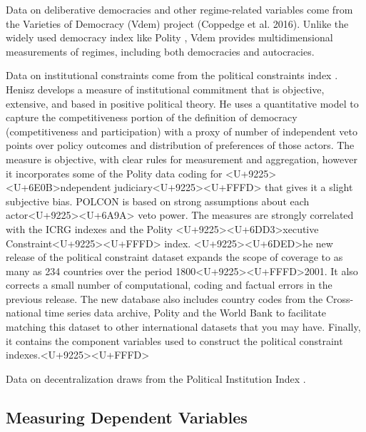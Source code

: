 \documentclass[12pt]{article}\usepackage[]{graphicx}\usepackage[]{color}
\begin{document}
Data on deliberative democracies and other regime-related variables come from the Varieties of Democracy (Vdem) project (Coppedge et al. 2016). Unlike the widely used democracy index like Polity \cite{Polity2015}, Vdem provides multidimensional measurements of regimes, including both democracies and autocracies. 

\nocite{Vdem2016}



Data on institutional constraints come from the political constraints index \cite{Henisz2000}. Henisz develops a measure of institutional commitment that is objective, extensive, and based in positive political theory. He uses a quantitative model to capture the competitiveness portion of the definition of democracy (competitiveness and participation) with a proxy of number of independent veto points over policy outcomes and distribution of preferences of those actors. The measure is objective, with clear rules for measurement and aggregation, however it incorporates some of the Polity data coding for <U+9225><U+6E0B>ndependent judiciary<U+9225><U+FFFD> that gives it a slight subjective bias. POLCON is based on strong assumptions about each actor<U+9225><U+6A9A> veto power. The measures are strongly correlated with the ICRG indexes and the Polity <U+9225><U+6DD3>xecutive Constraint<U+9225><U+FFFD> index. <U+9225><U+6DED>he new release of the political constraint dataset expands the scope of coverage to as many as 234 countries over the period 1800<U+9225><U+FFFD>2001. It also corrects a small number of computational, coding and factual errors in the previous release. The new database also includes country codes from the Cross-national time series data archive, Polity and the World Bank to facilitate matching this dataset to other international datasets that you may have. Finally, it contains the component variables used to construct the political constraint indexes.<U+9225><U+FFFD>




Data on decentralization draws from the Political Institution Index \cite{Becketal2001}. 

\nocite{KeeferStasavage2003}










\subsection{Measuring Dependent Variables}
\end{document}
